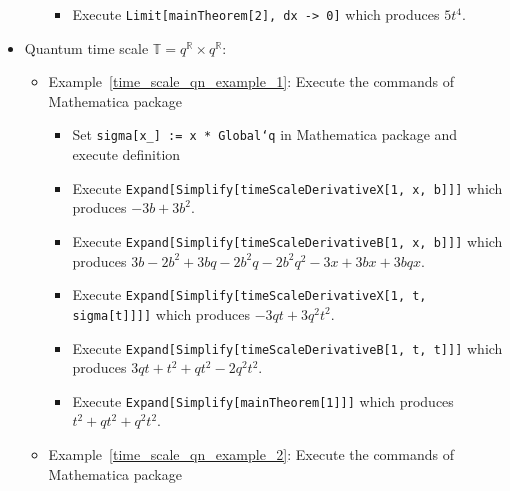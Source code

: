 \begin{itemize}
\begin{itemize}
\begin{itemize}
            \item Execute \texttt{Limit[mainTheorem[2], dx -> 0]} which produces $5t^4$.
        \end{itemize}
    \end{itemize}
    \item Quantum time scale $\mathbb{T} = q^\mathbb{R} \times q^\mathbb{R}$:
    \begin{itemize}
        \item Example~\ref{time_scale_qn_example_1}:
        Execute the commands of Mathematica package
        \begin{itemize}
            \item Set \texttt{sigma[x\_] := x * Global`q} in Mathematica package and execute definition
            \item Execute \texttt{Expand[Simplify[timeScaleDerivativeX[1, x, b]]]}
            which produces $-3 b + 3 b^2$.
            \item Execute \texttt{Expand[Simplify[timeScaleDerivativeB[1, x, b]]]}
            which produces $3 b - 2 b^2 + 3 b q - 2 b^2 q - 2 b^2 q^2 - 3 x + 3 b x + 3 b q x$.
            \item Execute \texttt{Expand[Simplify[timeScaleDerivativeX[1, t, sigma[t]]]]} which produces $-3 q t + 3 q^2 t^2$.
            \item Execute \texttt{Expand[Simplify[timeScaleDerivativeB[1, t, t]]]} which produces $3 q t + t^2 + q t^2 - 2 q^2 t^2$.
            \item Execute \texttt{Expand[Simplify[mainTheorem[1]]]} which produces $t^2 + q t^2 + q^2 t^2$.
        \end{itemize}
        \item Example~\ref{time_scale_qn_example_2}:
        Execute the commands of Mathematica package
\end{itemize}
\end{itemize}

